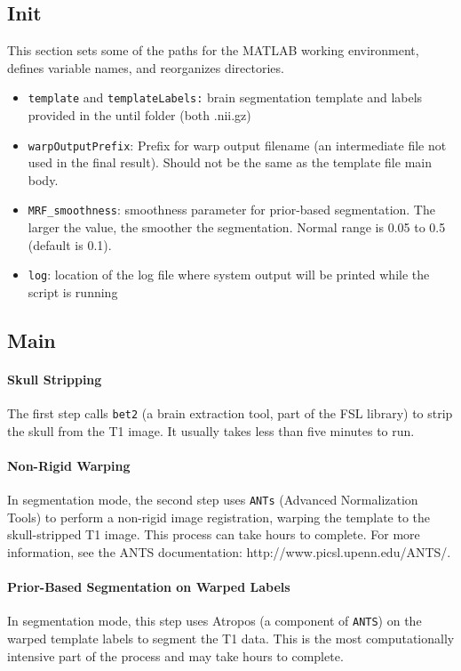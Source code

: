 \documentclass[12pt]{article}
\begin{document}
\subsection{Init}
This section sets some of the paths for the MATLAB working environment, defines variable names, and reorganizes directories. 
	\begin{itemize}
	\item \texttt{template} and \texttt{templateLabels:} brain segmentation template and labels provided in the until folder (both .nii.gz)
	\item \texttt{warpOutputPrefix}: Prefix for warp output filename (an intermediate file not used in the final result). Should not be the same as the template file main body. 
	\item \texttt{MRF\_smoothness}: smoothness parameter for prior-based segmentation. The larger the value, the smoother the segmentation. Normal range is 0.05 to 0.5 (default is 0.1). 
	\item \texttt{log}: location of the log file where system output will be printed while the script is running
	\end{itemize}

\subsection{Main}
\paragraph{Skull Stripping} The first step calls \texttt{bet2} (a brain extraction tool, part of the FSL library) to strip the skull from the T1 image. It usually takes less than five minutes to run. 
\paragraph{Non-Rigid Warping} In segmentation mode, the second step uses \texttt{ANTs} (Advanced Normalization Tools) to perform a non-rigid image registration, warping the template to the skull-stripped T1 image. This process can take hours to complete. For more information, see the ANTS documentation: http://www.picsl.upenn.edu/ANTS/.
\paragraph{Prior-Based Segmentation on Warped Labels} In segmentation mode, this step uses Atropos (a component of \texttt{ANTS}) on the warped template labels to segment the T1 data. This is the most computationally intensive part of the process and may take hours to complete.
\end{document}
